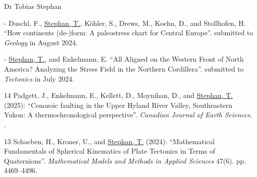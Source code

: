 \documentclass[10pt, paper=letter]{scrartcl} %
\begin{document}
\begin{cv}{\textsf{Dr Tobias Stephan}}
\begin{cvlist}{}
        \item[-] Duschl, F., \ul{Stephan, T.}, K\"ohler, S., Drews, M., Koehn, D., and Stollhofen, H. \enquote{How continents (de-)form: A paleostress chart for Central Europe}. submitted to \textit{Geology} in August 2024.
        \item[-] \ul{Stephan, T.}, and Enkelmann, E. \enquote{All Aligned on the Western Front of North America? Analyzing the Stress Field in the Northern Cordillera}. submitted to \textit{Tectonics} in July 2024.

        \item[14] Padgett, J., Enkelmann, E., Kellett, D., Moynihan, D., and \ul{Stephan, T.} (2025): \enquote{Cenozoic faulting in the Upper Hyland River Valley, Southeastern Yukon: A thermochronological perspective}. \textit{Canadian Journal of Earth Sciences}. .
        
        \item[13] Schaeben, H., Kroner, U., and \ul{Stephan, T.} (2024): \enquote{Mathematical Fundamentals of Spherical Kinematics of Plate Tectonics in Terms of Quaternions}. \textit{Mathematical Models and Methods in Applied Sciences} 47(6). pp. 4469--4496. 


\end{cvlist}
\end{cv}
\end{document}
